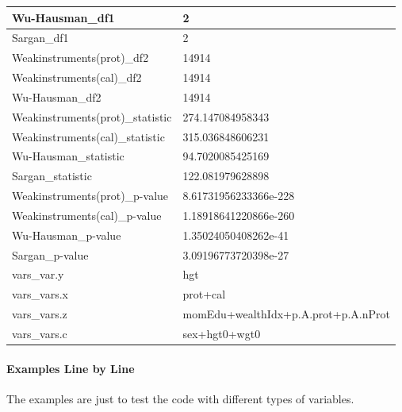 \documentclass[
]{book}
\begin{document}
\begin{table}[!h]
\begin{tabular}{l|l}
\hline
\rowcolor{gray!6}  Wu-Hausman\_df1 & 2\\
\hline
Sargan\_df1 & 2\\
\hline
\rowcolor{gray!6}  Weakinstruments(prot)\_df2 & 14914\\
\hline
Weakinstruments(cal)\_df2 & 14914\\
\hline
\rowcolor{gray!6}  Wu-Hausman\_df2 & 14914\\
\hline
Weakinstruments(prot)\_statistic & 274.147084958343\\
\hline
\rowcolor{gray!6}  Weakinstruments(cal)\_statistic & 315.036848606231\\
\hline
Wu-Hausman\_statistic & 94.7020085425169\\
\hline
\rowcolor{gray!6}  Sargan\_statistic & 122.081979628898\\
\hline
Weakinstruments(prot)\_p-value & 8.61731956233366e-228\\
\hline
\rowcolor{gray!6}  Weakinstruments(cal)\_p-value & 1.18918641220866e-260\\
\hline
Wu-Hausman\_p-value & 1.35024050408262e-41\\
\hline
\rowcolor{gray!6}  Sargan\_p-value & 3.09196773720398e-27\\
\hline
vars\_var.y & hgt\\
\hline
\rowcolor{gray!6}  vars\_vars.x & prot+cal\\
\hline
vars\_vars.z & momEdu+wealthIdx+p.A.prot+p.A.nProt\\
\hline
\rowcolor{gray!6}  vars\_vars.c & sex+hgt0+wgt0\\
\hline
\end{tabular}
\end{table}

\hypertarget{examples-line-by-line}{%
\paragraph{Examples Line by Line}\label{examples-line-by-line}}

The examples are just to test the code with different types of variables.
\end{document}
